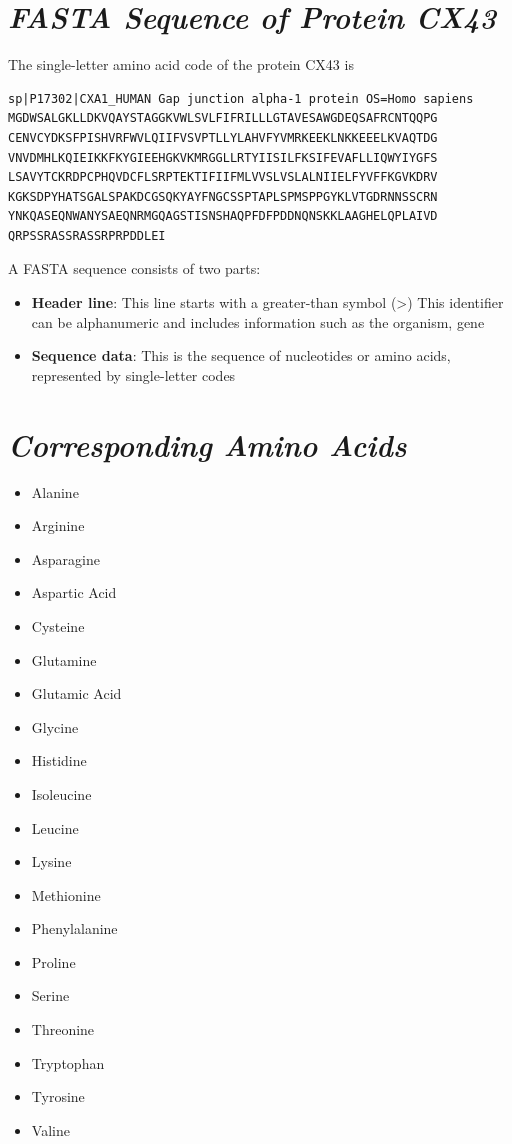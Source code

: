 \documentclass{article}
\begin{document}
\section*{\textit{FASTA Sequence of Protein CX43}}
The single-letter amino acid code of the protein CX43 is
\begin{verbatim}
sp|P17302|CXA1_HUMAN Gap junction alpha-1 protein OS=Homo sapiens
MGDWSALGKLLDKVQAYSTAGGKVWLSVLFIFRILLLGTAVESAWGDEQSAFRCNTQQPG
CENVCYDKSFPISHVRFWVLQIIFVSVPTLLYLAHVFYVMRKEEKLNKKEEELKVAQTDG
VNVDMHLKQIEIKKFKYGIEEHGKVKMRGGLLRTYIISILFKSIFEVAFLLIQWYIYGFS
LSAVYTCKRDPCPHQVDCFLSRPTEKTIFIIFMLVVSLVSLALNIIELFYVFFKGVKDRV
KGKSDPYHATSGALSPAKDCGSQKYAYFNGCSSPTAPLSPMSPPGYKLVTGDRNNSSCRN
YNKQASEQNWANYSAEQNRMGQAGSTISNSHAQPFDFPDDNQNSKKLAAGHELQPLAIVD
QRPSSRASSRASSRPRPDDLEI
\end{verbatim}
A FASTA sequence consists of two parts:
\vspace{0.25cm}
\begin{itemize}
    \item \textbf{Header line}: This line starts with a greater-than symbol (>)  This identifier can be alphanumeric and  includes  information such as the organism, gene
    \item \textbf{Sequence data}: This is the sequence of nucleotides or amino acids, represented by single-letter codes

\end{itemize}

\newpage



\section{\textit{Corresponding Amino Acids}}
\begin{itemize}
    \item Alanine 
    \item Arginine
    \item Asparagine
    \item Aspartic Acid
    \item Cysteine
    \item Glutamine
    \item Glutamic Acid
    \item Glycine
    \item Histidine
    \item Isoleucine
    \item Leucine
    \item Lysine
    \item Methionine
    \item Phenylalanine
    \item Proline
    \item Serine
    \item Threonine
    \item Tryptophan
    \item Tyrosine
    \item Valine
\end{itemize}
\newpage
\end{document}
